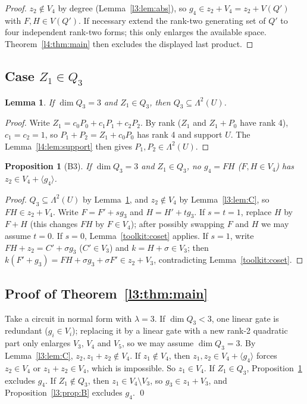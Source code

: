 \documentclass[11pt,a4paper]{article}
\theoremstyle{plain}
\newtheorem{lemma}[theorem]{Lemma}
\newtheorem{proposition}[theorem]{Proposition}
\theoremstyle{remark}
\newcommand{\Lam}{\Lambda^2}
\begin{document}
\begin{proof}
$z_2\notin V_4$ by degree (Lemma~\ref{l3:lem:abs}), so $g_4\in z_2+V_4=z_2+V(Q')$ with $F,H\in V(Q')$. If necessary extend the rank-two generating set of $Q'$ to four independent rank-two forms; this only enlarges the available space. Theorem~\ref{l4:thm:main} then excludes the displayed last product.
\end{proof}

\subsection{Case $Z_1\in Q_3$}

\begin{lemma}\label{l3:lem:B3U}
If $\dim Q_3=3$ and $Z_1\in Q_3$, then $Q_3\subseteq\Lam(U)$.
\end{lemma}

\begin{proof}
Write $Z_1=c_0P_0+c_1P_1+c_2P_2$. By rank ($Z_1$ and $Z_1+P_0$ have rank 4), $c_1=c_2=1$, so $P_1+P_2=Z_1+c_0P_0$ has rank 4 and support $U$. The Lemma~\ref{l4:lem:support} then gives $P_1,P_2\in\Lam(U)$.
\end{proof}

\begin{proposition}[B3]\label{l3:prop:B3}
If $\dim Q_3=3$ and $Z_1\in Q_3$, no $g_4=FH$ ($F,H\in V_4$) has $z_2\in V_4+\langle g_4\rangle$.
\end{proposition}

\begin{proof}
$Q_3\subseteq\Lam(U)$ by Lemma~\ref{l3:lem:B3U}, and $z_2\notin V_4$ by Lemma~\ref{l3:lem:C}, so $FH\in z_2+V_4$. Write $F=F'+sg_3$ and $H=H'+tg_3$. If $s=t=1$, replace $H$ by $F+H$ (this changes $FH$ by $F\in V_4$); after possibly swapping $F$ and $H$ we may assume $t=0$. If $s=0$, Lemma~\ref{toolkit:coset} applies. If $s=1$, write $FH+z_2=C'+\sigma g_3$ ($C'\in V_3$) and $k=H+\sigma\in V_3$; then $k(F'+g_3)=FH+\sigma g_3+\sigma F'\in z_2+V_3$, contradicting Lemma~\ref{toolkit:coset}.
\end{proof}

\subsection[Proof of the three-linear-gate theorem]{Proof of Theorem~\ref{l3:thm:main}}\label{l3:sec:proof}

Take a circuit in normal form with $\lambda=3$. If $\dim Q_3<3$, one linear gate is redundant ($g_i\in V_i$); replacing it by a linear gate with a new rank-2 quadratic part only enlarges $V_3$, $V_4$ and $V_5$, so we may assume $\dim Q_3=3$. By Lemma~\ref{l3:lem:C}, $z_2,z_1+z_2\notin V_4$. If $z_1\notin V_4$, then $z_1,z_2\in V_4+\langle g_4\rangle$ forces $z_2\in V_4$ or $z_1+z_2\in V_4$, which is impossible. So $z_1\in V_4$.
If $Z_1\in Q_3$, Proposition~\ref{l3:prop:B3} excludes $g_4$.
If $Z_1\notin Q_3$, then $z_1\in V_4\setminus V_3$, so $g_3\in z_1+V_3$, and Proposition~\ref{l3:prop:B} excludes $g_4$. \qed
\end{document}
